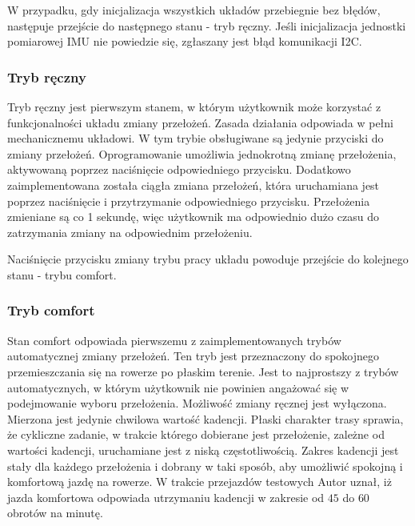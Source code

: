 W przypadku, gdy inicjalizacja wszystkich układów przebiegnie bez błędów, następuje przejście do następnego stanu - tryb ręczny. Jeśli inicjalizacja jednostki pomiarowej IMU nie powiedzie się, zgłaszany jest błąd komunikacji I2C. 
\subsubsection{Tryb ręczny}
Tryb ręczny jest pierwszym stanem, w którym użytkownik może korzystać z funkcjonalności układu zmiany przełożeń. Zasada działania odpowiada w pełni mechanicznemu układowi. W tym trybie obsługiwane są jedynie przyciski do zmiany przełożeń. Oprogramowanie umożliwia jednokrotną zmianę przełożenia, aktywowaną poprzez naciśnięcie odpowiedniego przycisku. Dodatkowo zaimplementowana została ciągła zmiana przełożeń, która uruchamiana jest poprzez naciśnięcie i przytrzymanie odpowiedniego przycisku. Przełożenia zmieniane są co 1 sekundę, więc użytkownik ma odpowiednio dużo czasu do zatrzymania zmiany na odpowiednim przełożeniu.

Naciśnięcie przycisku zmiany trybu pracy układu powoduje przejście do kolejnego stanu - trybu comfort.
\subsubsection{Tryb comfort}
Stan comfort odpowiada pierwszemu z zaimplementowanych trybów automatycznej zmiany przełożeń. Ten tryb jest przeznaczony do spokojnego przemieszczania się na rowerze po płaskim terenie. Jest to najprostszy z trybów automatycznych, w którym użytkownik nie powinien angażować się w podejmowanie wyboru przełożenia. Możliwość zmiany ręcznej jest wyłączona. Mierzona jest jedynie chwilowa wartość kadencji. Płaski charakter trasy sprawia, że cykliczne zadanie, w trakcie którego dobierane jest przełożenie, zależne od wartości kadencji, uruchamiane jest z niską częstotliwością. Zakres kadencji jest stały dla każdego przełożenia i dobrany w taki sposób, aby umożliwić spokojną i komfortową jazdę na rowerze. W trakcie przejazdów testowych Autor uznał, iż jazda komfortowa odpowiada utrzymaniu kadencji w zakresie od $45$ do $60$ obrotów na minutę.

